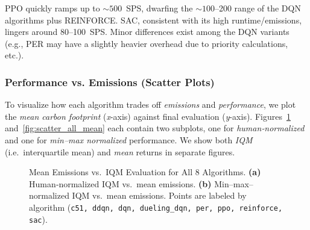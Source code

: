 PPO quickly ramps up to $\sim500$~SPS, dwarfing the $\sim100$--200 range of the DQN 
algorithms plus REINFORCE. 
SAC, consistent with its high runtime/emissions, lingers around 80--100~SPS. 
Minor differences exist among the DQN variants (e.g., PER may have a slightly heavier overhead 
due to priority calculations, etc.).

\subsubsection{Performance vs. Emissions (Scatter Plots)}
To visualize how each algorithm trades off \emph{emissions} and \emph{performance},
we plot the \textit{mean carbon footprint} (\textit{x}-axis) against final evaluation 
(\textit{y}-axis). Figures~\ref{fig:scatter_all_iqmean} and~\ref{fig:scatter_all_mean}
each contain two subplots, one for \textit{human‐normalized} and one for 
\textit{min--max normalized} performance. We show both \textit{IQM} (i.e.\ interquartile mean) 
and \textit{mean} returns in separate figures.

\begin{figure} 
	\centering
	\quad
	\caption{Mean Emissions vs.\ IQM Evaluation for All 8 Algorithms.
		\textbf{(a)} Human‐normalized IQM vs.\ mean emissions. 
		\textbf{(b)} Min--max–normalized IQM vs.\ mean emissions. 
		Points are labeled by algorithm (\texttt{c51, ddqn, dqn, dueling\_dqn, per, ppo, reinforce, sac}).}
	\label{fig:scatter_all_iqmean}
\end{figure}

